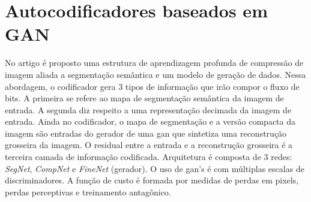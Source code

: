 













\section{Autocodificadores baseados em GAN}



No artigo \cite{akbari2019dsslic} é proposto uma estrutura de aprendizagem profunda de compressão de imagem aliada a segmentação semântica e um modelo de geração de dados. 
Nessa abordagem, o codificador gera 3 tipos de informação que irão compor o fluxo de bits. A primeira se refere ao mapa de segmentação semântica da imagem de entrada. A segunda diz respeito a uma representação decimada da imagem de entrada. Ainda no codificador, o mapa de segmentação e a versão compacta da imagem são entradas do gerador de uma \acrshort{gan} que sintetiza uma reconstrução grosseira da imagem. O residual entre a entrada e a reconstrução grosseira é a terceira camada de informação codificada. Arquitetura é composta de 3 redes: \textit{SegNet}, \textit{CompNet} e \textit{FineNet} (gerador). O uso de \acrshort{gan}'s é com múltiplas escalas de discriminadores. 
A função de custo é formada por medidas de perdas em pixels, perdas perceptivas e treinamento antagônico.

